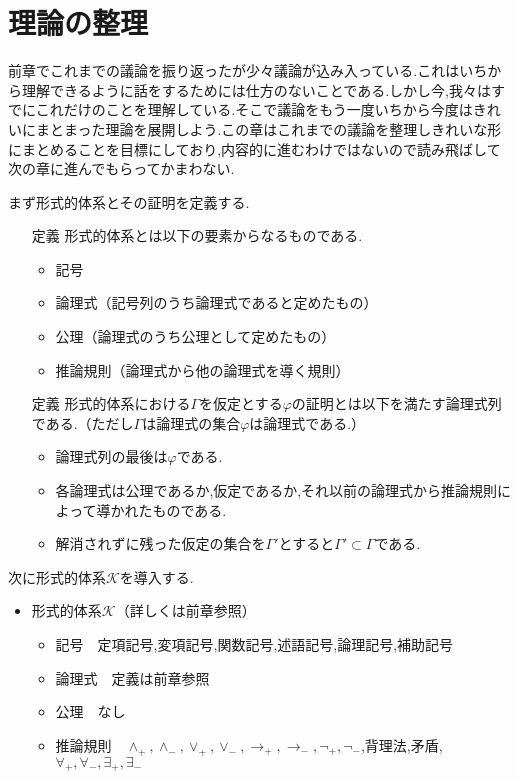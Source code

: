 \documentclass[10pt,b5paper,papersize,dvipdfmx]{jsbook}
\begin{document}
\section{理論の整理}
前章でこれまでの議論を振り返ったが少々議論が込み入っている.これはいちから理解できるように話をするためには仕方のないことである.しかし今,我々はすでにこれだけのことを理解している.そこで議論をもう一度いちから今度はきれいにまとまった理論を展開しよう.この章はこれまでの議論を整理しきれいな形にまとめることを目標にしており,内容的に進むわけではないので読み飛ばして次の章に進んでもらってかまわない.\par
まず形式的体系とその証明を定義する.
\begin{itemize}
\item[定義] 形式的体系とは以下の要素からなるものである.
\begin{itemize}
\item 記号
\item 論理式（記号列のうち論理式であると定めたもの）
\item 公理（論理式のうち公理として定めたもの）
\item 推論規則（論理式から他の論理式を導く規則）
\end{itemize}
\end{itemize}
\begin{itemize}
\item[定義] 形式的体系における$\Gamma$を仮定とする$\varphi$の証明とは以下を満たす論理式列である.（ただし$\Gamma$は論理式の集合$\varphi$は論理式である.）
\begin{itemize}
\item 論理式列の最後は$\varphi$である.
\item 各論理式は公理であるか,仮定であるか,それ以前の論理式から推論規則によって導かれたものである.
\item 解消されずに残った仮定の集合を$\Gamma'$とすると$\Gamma'\subset \Gamma$である.
\end{itemize}
\end{itemize}
次に形式的体系$\mathcal K$を導入する.
\begin{itemize}
\item 形式的体系$\mathcal K$（詳しくは前章参照）
\begin{itemize}
\item 記号　定項記号,変項記号,関数記号,述語記号,論理記号,補助記号
\item 論理式　定義は前章参照
\item 公理　なし
\item 推論規則　$\land_+,\land_-,\lor_+,\lor_-,\to_+,\to_-,\lnot_+,\lnot_-$,背理法,矛盾,$\forall_+,\forall_-,\exists_+,\exists_-$
\end{itemize}
\end{itemize}
\end{document}
